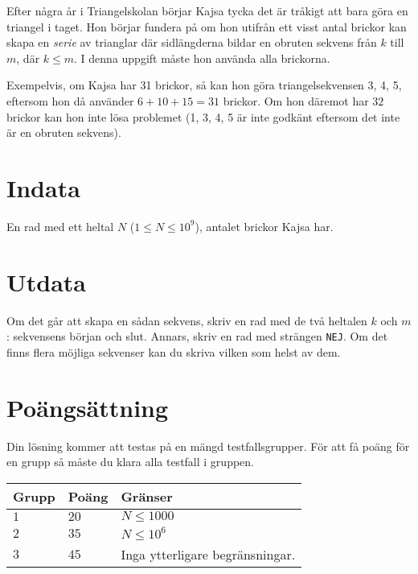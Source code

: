 
Efter några år i Triangelskolan börjar Kajsa tycka det är tråkigt att bara göra en triangel i taget. Hon börjar fundera på om hon utifrån ett visst antal brickor kan skapa en {\em serie} av trianglar där sidlängderna bildar en obruten sekvens från $k$ till $m$, där $k\le m$. I denna uppgift måste hon använda alla brickorna.

Exempelvis, om Kajsa har 31 brickor, så kan hon göra triangelsekvensen 3, 4, 5, eftersom hon då använder $6+10+15=31$ brickor. Om hon däremot har $32$ brickor kan hon inte lösa problemet (1, 3, 4, 5 är inte godkänt eftersom det inte är en obruten sekvens).

\section*{Indata}
En rad med ett heltal $N$ ($1 \leq N \leq 10^9$), antalet brickor Kajsa har.

\section*{Utdata}
Om det går att skapa en sådan sekvens, skriv en rad med de två heltalen $k$ och $m$: sekvensens början och slut. Annars, skriv en rad med strängen \texttt{NEJ}. Om det finns flera möjliga sekvenser kan du skriva vilken som helst av dem.

\section*{Poängsättning}
Din lösning kommer att testas på en mängd testfallsgrupper.
För att få poäng för en grupp så måste du klara alla testfall i gruppen.

\noindent
\begin{tabular}{| l | l | p{12cm} |}
  \hline
  \textbf{Grupp} & \textbf{Poäng} & \textbf{Gränser} \\ \hline
  $1$    & $20$      & $N \leq 1000$ \\ \hline
  $2$    & $35$      & $N \leq 10^6$ \\ \hline
  $3$    & $45$      & Inga ytterligare begränsningar. \\ \hline
\end{tabular}
